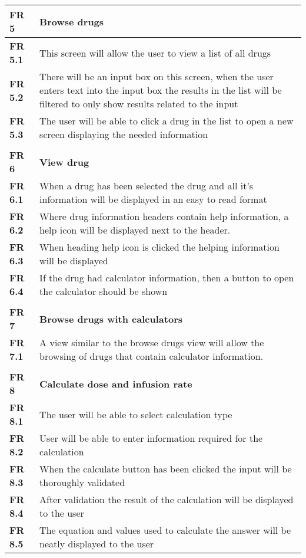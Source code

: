 \begin{center}
\begin{longtable}{| l | p{12cm} |}
\textbf{FR 5}   & \textbf{Browse drugs}\\ \hline
\textbf{FR 5.1} & This screen will allow the user to view a list of all drugs  \\ \hline
\textbf{FR 5.2} & There will be an input box on this screen, when the user enters text into the input box the results in the list will be filtered to only show results related to the input \\ \hline
\textbf{FR 5.3} & The user will be able to click a drug in the list to open a new screen displaying the needed information  \\ \hline
\textbf{}  &  \\ \hline
\textbf{FR 6}   & \textbf{View drug}   \\ \hline
\textbf{FR 6.1} & When a drug has been selected the drug and all it’s information will be displayed in an easy to read format    \\ \hline
\textbf{FR 6.2} & Where drug information headers contain help information, a help icon will be displayed next to the header.\\ \hline
\textbf{FR 6.3} & When heading help icon is clicked the helping information will be displayed \\ \hline
\textbf{FR 6.4} & If the drug had calculator information, then a button to open the calculator should be shown    \\ \hline
\textbf{}  &  \\ \hline
\textbf{FR 7}   & \textbf{Browse drugs with calculators}   \\ \hline
\textbf{FR 7.1} & A view similar to the browse drugs view will allow the browsing of drugs that contain calculator information.  \\ \hline
\textbf{}  &  \\ \hline
\textbf{FR 8}   & \textbf{Calculate dose and infusion rate}\\ \hline
\textbf{FR 8.1} & The user will be able to select calculation type   \\ \hline
\textbf{FR 8.2} & User will be able to enter information required for the calculation    \\ \hline
\textbf{FR 8.3} & When the calculate button has been clicked the input will be thoroughly validated\\ \hline
\textbf{FR 8.4} & After validation the result of the calculation will be displayed to the user\\ \hline
\textbf{FR 8.5} & The equation and values used to calculate the answer will be neatly displayed to the user  \\ \hline

\end{longtable}
\end{center}
